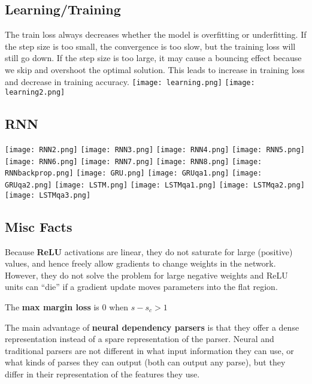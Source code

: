 \subsection*{Learning/Training}
The train loss always decreases whether the model is overfitting
or underfitting. If the step size is too small, the convergence is too slow, but
the training loss will still go down. If the step size is too large, it may cause a
bouncing effect because we skip and overshoot the optimal solution. This leads
to increase in training loss and decrease in training accuracy.
\texttt{[image: learning.png]}
\texttt{[image: learning2.png]}

\subsection*{RNN}
\texttt{[image: RNN2.png]}
\texttt{[image: RNN3.png]}
\texttt{[image: RNN4.png]}
\texttt{[image: RNN5.png]}
\texttt{[image: RNN6.png]}
\texttt{[image: RNN7.png]}
\texttt{[image: RNN8.png]}
\texttt{[image: RNNbackprop.png]}
\texttt{[image: GRU.png]}
\texttt{[image: GRUqa1.png]}
\texttt{[image: GRUqa2.png]}
\texttt{[image: LSTM.png]}
\texttt{[image: LSTMqa1.png]}
\texttt{[image: LSTMqa2.png]}
\texttt{[image: LSTMqa3.png]}

\subsection*{Misc Facts}
Because \textbf{ReLU} activations are linear, they do not saturate for
large (positive) values, and hence freely allow gradients to change weights
in the network. However, they do not solve the problem for large negative
weights and ReLU units can “die” if a gradient update moves parameters
into the flat region.

The \textbf{max margin loss} is 0 when $s−s_c>1$

The main advantage of \textbf{neural dependency parsers} is that they offer a dense representation instead of a spare representation of the parser. Neural and traditional parsers are not different in what input information they can use, or what kinds of parses they can output (both can output any parse), but they differ in their representation of the features they use.


